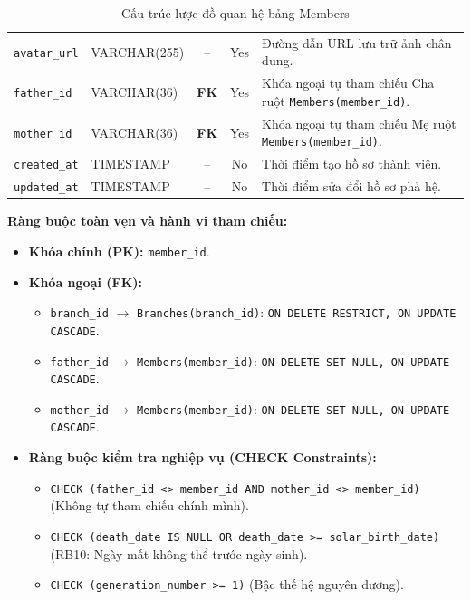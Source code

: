 \begin{table}[H]
\begin{tabularx}{\textwidth}{p{3.4cm} p{2.4cm} c c X}
        \texttt{avatar\_url} & VARCHAR(255) & -- & Yes & Đường dẫn URL lưu trữ ảnh chân dung. \\
        \rowcolor{tablerowalt}
        \texttt{father\_id} & VARCHAR(36) & \textcolor{fkcolor}{\textbf{FK}} & Yes & Khóa ngoại tự tham chiếu Cha ruột \texttt{Members(member\_id)}. \\
        \texttt{mother\_id} & VARCHAR(36) & \textcolor{fkcolor}{\textbf{FK}} & Yes & Khóa ngoại tự tham chiếu Mẹ ruột \texttt{Members(member\_id)}. \\
        \rowcolor{tablerowalt}
        \texttt{created\_at} & TIMESTAMP & -- & No & Thời điểm tạo hồ sơ thành viên. \\
        \texttt{updated\_at} & TIMESTAMP & -- & No & Thời điểm sửa đổi hồ sơ phả hệ. \\
        \bottomrule
    \end{tabularx}
    \caption{Cấu trúc lược đồ quan hệ bảng Members}
    \label{tab:schema_members}
\end{table}

\noindent\textbf{Ràng buộc toàn vẹn và hành vi tham chiếu:}
\begin{itemize}[noitemsep,topsep=2pt]
    \item \textbf{Khóa chính (PK):} \texttt{member\_id}.
    \item \textbf{Khóa ngoại (FK):}
    \begin{itemize}[noitemsep]
        \item \texttt{branch\_id} $\rightarrow$ \texttt{Branches(branch\_id)}: \texttt{ON DELETE RESTRICT, ON UPDATE CASCADE}.
        \item \texttt{father\_id} $\rightarrow$ \texttt{Members(member\_id)}: \texttt{ON DELETE SET NULL, ON UPDATE CASCADE}.
        \item \texttt{mother\_id} $\rightarrow$ \texttt{Members(member\_id)}: \texttt{ON DELETE SET NULL, ON UPDATE CASCADE}.
    \end{itemize}
    \item \textbf{Ràng buộc kiểm tra nghiệp vụ (CHECK Constraints):}
    \begin{itemize}[noitemsep]
        \item \texttt{CHECK (father\_id <> member\_id AND mother\_id <> member\_id)} (Không tự tham chiếu chính mình).
        \item \texttt{CHECK (death\_date IS NULL OR death\_date >= solar\_birth\_date)} (RB10: Ngày mất không thể trước ngày sinh).
        \item \texttt{CHECK (generation\_number >= 1)} (Bậc thế hệ nguyên dương).
    \end{itemize}
\end{itemize}

